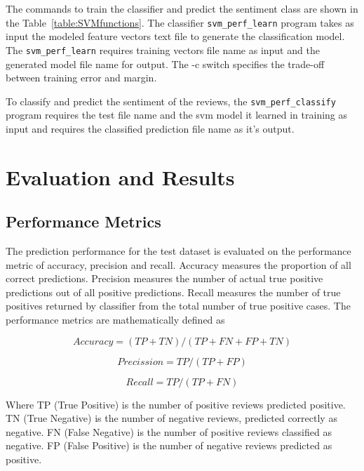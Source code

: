 \documentclass[conference]{IEEEtran}
\begin{document}
The commands to train the classifier and predict the sentiment class are shown in the Table~\ref{table:SVMfunctions}. The classifier \verb|svm_perf_learn| program takes as input the modeled feature vectors text file to generate the classification model. The \verb|svm_perf_learn| requires training vectors file name as input and the generated model file name for output. The -c switch specifies the trade-off between training error and margin.

To classify and predict the sentiment of the reviews, the \verb|svm_perf_classify| program requires the test file name and the svm model it learned in training as input and requires the classified prediction file name as it's output.        

\section{Evaluation and Results}

\subsection{Performance Metrics}



The prediction performance for the test dataset is evaluated on the performance metric of accuracy, precision and recall. Accuracy measures the proportion of all correct predictions. Precision measures the number of actual true positive predictions out of all positive predictions. Recall measures the number of true positives returned by classifier from the total number of true positive cases. The performance metrics are mathematically defined as

\begin{equation*}
Accuracy = (TP + TN) / (T P + FN + FP + T N)
\end{equation*}

\begin{equation*}
Precission = TP / (T P + FP)
\end{equation*}

\begin{equation*}
Recall = TP / (T P + FN)
\end{equation*} 

Where TP (True Positive) is the number of positive reviews predicted positive. TN (True Negative) is
the number of negative reviews, predicted correctly as negative. FN (False Negative) is the number of
positive reviews classified as negative. FP (False Positive) is the number of negative reviews predicted
as positive.
    
\end{document}
